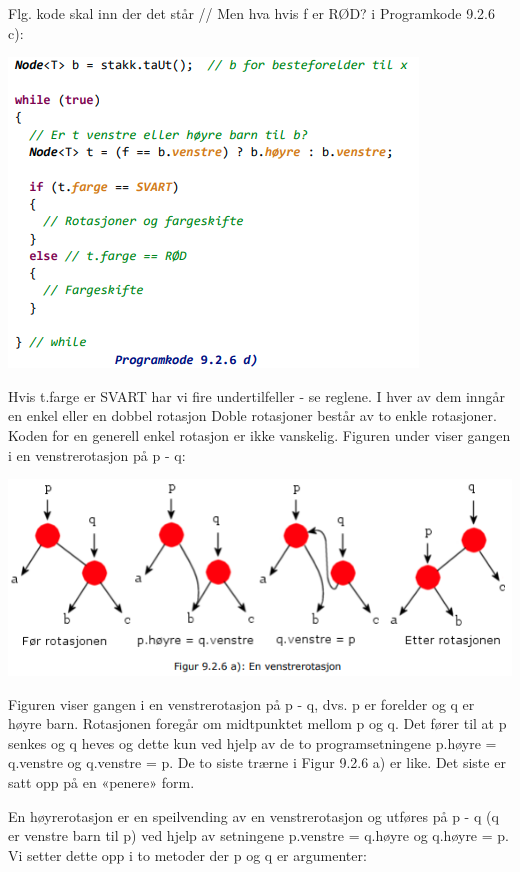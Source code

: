 \documentclass[11pt]{article}
\begin{document}
        Flg. kode skal inn der det står // Men hva hvis f er RØD? i Programkode 9.2.6 c):

        \includegraphics[center]{pk-9.2.6d.png}

        Hvis t.farge er SVART har vi fire undertilfeller - se reglene. I hver av dem inngår en enkel
        eller en dobbel rotasjon Doble rotasjoner består av to enkle rotasjoner. Koden for en generell
        enkel rotasjon er ikke vanskelig. Figuren under viser gangen i en venstrerotasjon på p - q:

        \includegraphics[center]{f-9.2.6a.png}

        Figuren viser gangen i en venstrerotasjon på p - q, dvs. p er forelder og q er høyre barn.
        Rotasjonen foregår om midtpunktet mellom p og q. Det fører til at p senkes og q heves og
        dette kun ved hjelp av de to programsetningene p.høyre = q.venstre og q.venstre = p. De
        to siste trærne i Figur 9.2.6 a) er like. Det siste er satt opp på en «penere» form.

        En høyrerotasjon er en speilvending av en venstrerotasjon og utføres på p - q (q er venstre
        barn til p) ved hjelp av setningene p.venstre = q.høyre og q.høyre = p. Vi setter dette opp
        i to metoder der p og q er argumenter:
\end{document}
